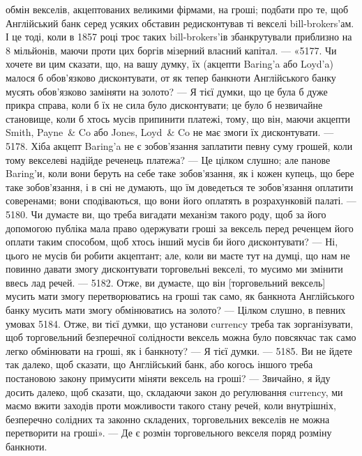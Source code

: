 \parcont{}  %
обмін векселів, акцептованих великими фірмами, на гроші; подбати про те,
щоб Англійський банк серед усяких обставин редисконтував ті векселі bill-brokers’ам.
І це тоді, коли в 1857 році троє таких bill-brokers’ів збанкрутували
приблизно на 8 мільйонів, маючи проти цих боргів мізерний власний капітал. —
«5177. Чи хочете ви цим сказати, що, на вашу думку, їх (акцепти Baring'a або
Loyd’a) малося б обов’язково дисконтувати, от як тепер банкноти Англійського
банку мусять обов’язково заміняти на золото? — Я тієї думки, що це була б
дуже прикра справа, коли б їх не сила було дисконтувати; це було б незвичайне
становище, коли б хтось мусів припинити платежі, тому, що він, маючи акцепти
Smith, Payne~\& Co або Jones, Loyd~\& Co не має змоги їх дисконтувати. — 5178.
Хіба акцепт Baring’a не є зобов’язання заплатити певну суму грошей, коли тому
векселеві надійде реченець платежа? — Це цілком слушно; але панове Baring’и,
коли вони беруть на себе таке зобов’язання, як і кожен купець, що бере таке
зобов’язання, і в сні не думають, що їм доведеться те зобов’язання оплатити
соверенами; вони сподіваються, що вони його оплатять в розрахунковій палаті. —
5180. Чи думаєте ви, що треба вигадати механізм такого роду, щоб за його
допомогою публіка мала право одержувати гроші за вексель перед реченцем його
оплати таким способом, щоб хтось інший мусів би його дисконтувати? —
Ні, цього не мусів би робити акцептант; але, коли ви маєте тут на думці, що
нам не повинно давати змогу дисконтувати торговельні векселі, то мусимо ми змінити
ввесь лад речей. — 5182. Отже, ви думаєте, що він [торговельний вексель] мусить
мати змогу перетворюватись на гроші так само, як банкнота Англійського банку
мусить мати змогу обмінюватись на золото? — Цілком слушно, в певних умовах
5184. Отже, ви тієї думки, що установи currency треба так зорганізувати, щоб торговельний
безперечної солідности вексель можна було повсякчас так само легко
обмінювати на гроші, як і банкноту? — Я тієї думки. — 5185. Ви не йдете так
далеко, щоб сказати, що Англійський банк, або когось іншого треба постановою
закону примусити міняти вексель на гроші? — Звичайно, я йду досить далеко,
щоб сказати, що, складаючи закон до реґулювання currency, ми маємо вжити
заходів проти можливости такого стану речей, коли внутрішніх, безперечно
солідних та законно складених, торговельних векселів не можна перетворити
на гроші». — Де є розмін торговельного векселя поряд розміну банкноти.


